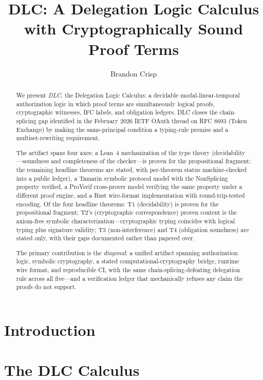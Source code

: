 \documentclass[acmsmall,nonacm]{acmart}
\title{DLC: A Delegation Logic Calculus with Cryptographically Sound Proof Terms}
\author{Brandon Crisp}
\affiliation{%
  \institution{Coproduct}
  \country{USA}
}
\begin{document}
\begin{abstract}
We present \emph{DLC}, the Delegation Logic Calculus: a decidable
modal-linear-temporal authorization logic in which proof terms are
simultaneously logical proofs, cryptographic witnesses, IFC labels,
and obligation ledgers. DLC closes the chain-splicing gap identified
in the February 2026 IETF OAuth thread on RFC 8693 (Token Exchange) by
making the same-principal condition a typing-rule premise and a
multiset-rewriting requirement.

The artifact spans four axes: a Lean~4 mechanization of the type
theory (decidability---soundness and completeness of the
checker---is proven for the propositional fragment; the remaining
headline theorems are stated, with per-theorem status machine-checked
into a public ledger), a Tamarin symbolic protocol model with the
NonSplicing property verified, a ProVerif cross-prover model
verifying the same property under a different proof engine, and a
Rust wire-format implementation with round-trip-tested encoding.
Of the four headline theorems: T1 (decidability) is proven for the
propositional fragment; T2's (cryptographic correspondence) proven
content is the axiom-free symbolic characterization---cryptographic
typing coincides with logical typing plus signature validity; T3
(non-interference) and T4 (obligation soundness) are stated only,
with their gaps documented rather than papered over.

The primary contribution is the \emph{diagonal}: a unified artifact
spanning authorization logic, symbolic cryptography, a stated
computational-cryptography bridge, runtime wire format, and
reproducible CI, with the same chain-splicing-defeating delegation
rule across all five---and a verification ledger that mechanically
refuses any claim the proofs do not support.
\end{abstract}

\maketitle

\section{Introduction}


\section{The DLC Calculus}
\label{sec:calculus}

\end{document}
